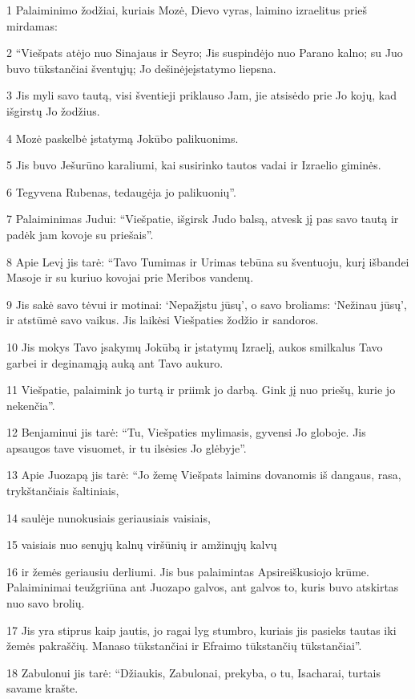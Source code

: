 \par 1 Palaiminimo žodžiai, kuriais Mozė, Dievo vyras, laimino izraelitus prieš mirdamas: 
\par 2 “Viešpats atėjo nuo Sinajaus ir Seyro; Jis suspindėjo nuo Parano kalno; su Juo buvo tūkstančiai šventųjų; Jo dešinėje­įstatymo liepsna. 
\par 3 Jis myli savo tautą, visi šventieji priklauso Jam, jie atsisėdo prie Jo kojų, kad išgirstų Jo žodžius. 
\par 4 Mozė paskelbė įstatymą Jokūbo palikuonims. 
\par 5 Jis buvo Ješurūno karaliumi, kai susirinko tautos vadai ir Izraelio giminės. 
\par 6 Tegyvena Rubenas, tedaugėja jo palikuonių”. 
\par 7 Palaiminimas Judui: “Viešpatie, išgirsk Judo balsą, atvesk jį pas savo tautą ir padėk jam kovoje su priešais”. 
\par 8 Apie Levį jis tarė: “Tavo Tumimas ir Urimas tebūna su šventuoju, kurį išbandei Masoje ir su kuriuo kovojai prie Meribos vandenų. 
\par 9 Jis sakė savo tėvui ir motinai: ‘Nepažįstu jūsų’, o savo broliams: ‘Nežinau jūsų’, ir atstūmė savo vaikus. Jis laikėsi Viešpaties žodžio ir sandoros. 
\par 10 Jis mokys Tavo įsakymų Jokūbą ir įstatymų Izraelį, aukos smilkalus Tavo garbei ir deginamąją auką ant Tavo aukuro. 
\par 11 Viešpatie, palaimink jo turtą ir priimk jo darbą. Gink jį nuo priešų, kurie jo nekenčia”. 
\par 12 Benjaminui jis tarė: “Tu, Viešpaties mylimasis, gyvensi Jo globoje. Jis apsaugos tave visuomet, ir tu ilsėsies Jo glėbyje”. 
\par 13 Apie Juozapą jis tarė: “Jo žemę Viešpats laimins dovanomis iš dangaus, rasa, trykštančiais šaltiniais, 
\par 14 saulėje nunokusiais geriausiais vaisiais, 
\par 15 vaisiais nuo senųjų kalnų viršūnių ir amžinųjų kalvų 
\par 16 ir žemės geriausiu derliumi. Jis bus palaimintas Apsireiškusiojo krūme. Palaiminimai teužgriūna ant Juozapo galvos, ant galvos to, kuris buvo atskirtas nuo savo brolių. 
\par 17 Jis yra stiprus kaip jautis, jo ragai lyg stumbro, kuriais jis pasieks tautas iki žemės pakraščių. Manaso tūkstančiai ir Efraimo tūkstančių tūkstančiai”. 
\par 18 Zabulonui jis tarė: “Džiaukis, Zabulonai, prekyba, o tu, Isacharai, turtais savame krašte. 
